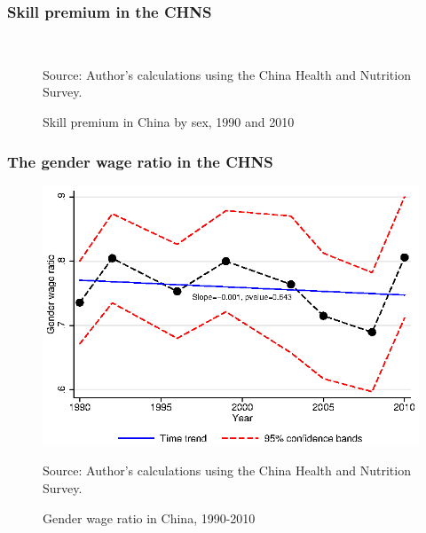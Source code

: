 \documentclass{beamer}
\newcommand{\source}[1]{\caption*{Source: {#1}} }
\begin{document}
\begin{frame}[noframenumbering]
	\frametitle{Skill premium in the CHNS}\label{appendix:skill_premium_chns}
	\begin{figure}[hp]
		\centering
		\caption{Skill premium in China by sex, 1990 and 2010}
		~
		\source{Author's calculations using the China Health and Nutrition Survey.}
	\end{figure}
	\hyperlink{appendix:wage_struct}{}
\end{frame}

\begin{frame}[noframenumbering]
	\frametitle{The gender wage ratio in the CHNS}\label{appendix:gender_wage_ratio_chns}
	\begin{figure}
		\centering
		\caption{Gender wage ratio in China, 1990-2010}
		\includegraphics[width=.6\textwidth]{gender_wage_ratio}
		\source{Author's calculations using the China Health and Nutrition Survey.}
	\end{figure}
	\hyperlink{appendix:wage_struct}{}
\end{frame}
\end{document}
